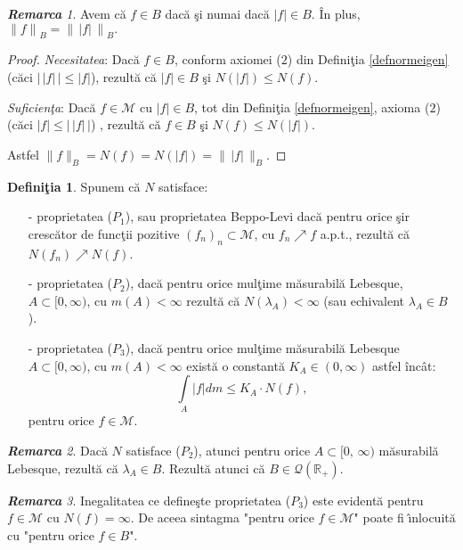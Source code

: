 \documentclass[ a4paper, 12pt]{report}
\theoremstyle{definition}
\newtheorem{definition}{\bf Defini\c tia}[section]
\theoremstyle{remark}
\newtheorem{remarc}{\bf Remarca}[section]
\numberwithin{equation}{section}
\begin{document}
\begin{remarc}
Avem c\u a $f \in B$ dac\u a \c si numai dac\u a $\lvert f \rvert \in B$. \^In plus, ${\lVert f \rVert}_B = {\lVert\, |f| \, \rVert}_B.$
\end{remarc}
\begin{proof} {\it Necesitatea}: Dac\u a $f \in B$, conform axiomei ($2$) din Defini\c tia \ref{defnormeigen} (c\u aci $\big|\, |f|\, \big| \leq |f|$), rezult\u a c\u a $\lvert f \rvert \in B$ \c si $N(\lvert f \rvert) \leq N(f)$.

{\it Suficien\c ta}: Dac\u a $f \in \mathcal{M}$ cu $|f| \in B$, tot din Defini\c tia \ref{defnormeigen}, axioma ($2$) (c\u aci $|f| \leq \big|\, |f|\, \big|$) , rezult\u a c\u a $f \in B$ \c si $N(f) \leq N(|f|)$.

Astfel $\lVert f \rVert_B = N(f) = N(|f|) = \lVert\, |f| \, \rVert_B$.
\end{proof}

\begin{definition}
Spunem c\u a $N$ satisface:
\begin{itemize}
\item[-] proprietatea ($P_1$), sau proprietatea Beppo-Levi dac\u a pentru orice \c sir cresc\u ator de func\c tii pozitive $(f_n)_n \subset \mathcal{M}$, cu $f_n \nearrow f$ a.p.t., rezult\u a c\u a  $N(f_n) \nearrow N(f)$.

\item[-] proprietatea ($P_2$), dac\u a pentru orice mul\c time m\u asurabil\u a Lebesque, $A \subset [0, \infty)$, cu $m(A)<\infty$  rezult\u a c\u a $N(\lambda_A)<\infty$ (sau echivalent $\lambda_A \in B$).

\item[-] proprietatea ($P_3$), dac\u a pentru orice mul\c time m\u asurabil\u a Lebesque $A \subset [0, \infty)$, cu $m(A)<\infty$  exist\u a o constant\u a $K_A \in (0,\infty)$ astfel \^inc\^at:
$$\int\limits_{A} \lvert f \rvert dm \leq K_A \cdot N(f),$$ pentru orice $f \in \mathcal{M}$.
\end{itemize}
\end{definition}

\begin{remarc}
Dac\u a $N$ satisface ($P_2$), atunci pentru orice $A \subset [0, \, \infty)$ m\u asurabil\u a Lebesque, rezult\u a c\u a $\lambda_A \in B$. Rezult\u a atunci c\u a $B \in \mathcal{Q}(\mathbb{R}_+)$.
\end{remarc}

\begin{remarc}
Inegalitatea ce define\c ste proprietatea ($P_3$) este evident\u a pentru $f \in \mathcal{M}$ cu $N(f)=\infty$. De aceea sintagma "pentru orice $f \in \mathcal{M}$" poate fi \^\i nlocuit\u a cu "pentru orice $f \in B$".
\end{remarc}
\end{document}
